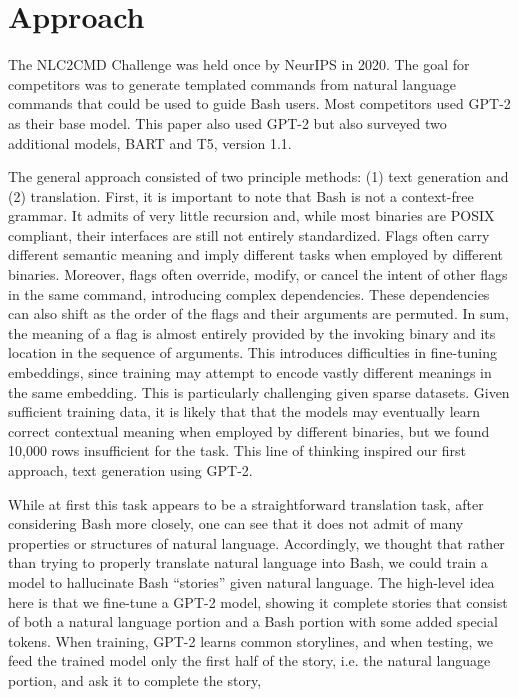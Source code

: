 \documentclass{article}
\begin{document}
\section{Approach}
The NLC2CMD Challenge was held once by NeurIPS in 2020. The goal for
competitors was to generate templated commands from natural language commands
that could be used to guide Bash users. Most competitors used GPT-2 as their
base model. This paper also used GPT-2 but also surveyed two additional models,
BART and T5, version 1.1.
\par
The general approach consisted of two principle methods: (1) text generation
and (2) translation. First, it is important to note that Bash is not a
context-free grammar. It admits of very little recursion and, while most
binaries are POSIX compliant, their interfaces are still not entirely
standardized. Flags often carry different semantic meaning and imply
different tasks when employed by different binaries. Moreover, flags often
override, modify, or cancel the intent of other flags in the same command,
introducing complex dependencies. These dependencies can also shift as the
order of the flags and their arguments are permuted. In sum, the meaning of a
flag is almost entirely provided by the invoking binary and its location in the
sequence of arguments. This introduces difficulties in fine-tuning embeddings,
since training may attempt to encode
vastly different meanings in the same embedding. This is particularly
challenging given sparse datasets. Given sufficient training data, it is likely
that that the models may eventually learn correct contextual meaning when
employed by different binaries, but we found 10,000 rows insufficient for the
task. This line of thinking inspired our first approach, text generation using
GPT-2.
\par
While at first this task appears to be a straightforward translation task,
after considering Bash more closely, one can see that it does not admit of many
properties or structures of natural language. Accordingly, we thought that
rather than trying to properly translate natural language into Bash, we could
train a model to hallucinate Bash ``stories'' given natural language. The
high-level idea here is that we fine-tune a GPT-2 model, showing it complete
stories that consist of both a natural language portion and a Bash portion with
some added special tokens. When training, GPT-2 learns common storylines,
and when testing, we feed the trained model only the first half of the
story, i.e. the natural language portion, and ask it to complete the story,
\end{document}
